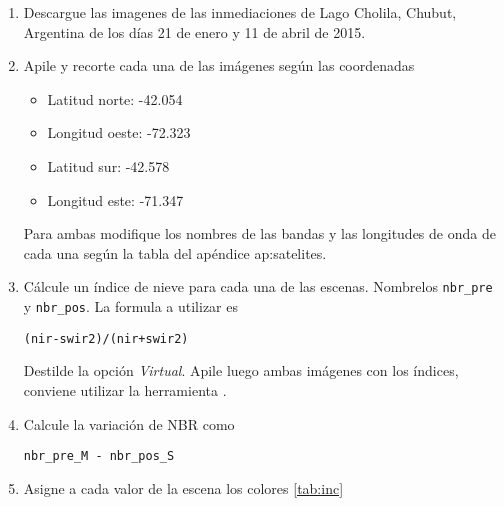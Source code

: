 \begin{enumerate}
\item Descargue las imagenes de las inmediaciones de Lago Cholila, Chubut, Argentina de los días 21 de enero y 11 de abril de 2015.

\item Apile y recorte cada una de las imágenes según las coordenadas

\begin{itemize}
    \item Latitud norte: -42.054
    \item Longitud oeste: -72.323
    \item Latitud sur: -42.578
    \item Longitud este: -71.347
\end{itemize}

Para ambas modifique los nombres de las bandas y las longitudes de onda de cada una según la tabla del apéndice ap:satelites.

\item Cálcule un índice de nieve para cada una de las escenas. Nombrelos \texttt{nbr\_pre} y \texttt{nbr\_pos}. La formula a utilizar es

\begin{verbatim}
(nir-swir2)/(nir+swir2)
\end{verbatim}

Destilde la opción \emph{Virtual}. Apile luego ambas imágenes con los índices, conviene utilizar la herramienta .

\item Calcule la variación de NBR como

\begin{verbatim}
nbr_pre_M - nbr_pos_S
\end{verbatim}

\item Asigne a cada valor de la escena los colores \ref{tab:inc}


\end{enumerate}
